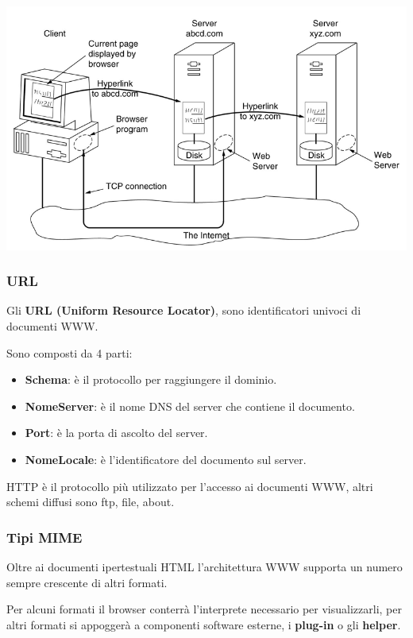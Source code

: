         \begin{center}
            \includegraphics[scale=0.4]{chapters/6/assets/schema_h.png}
        \end{center}

        \subsubsection{URL}
            Gli \textbf{URL (Uniform Resource Locator)}, sono identificatori univoci di documenti WWW.

            Sono composti da 4 parti:
            \begin{itemize}
                \item \textbf{Schema}: è il protocollo per raggiungere il dominio.
                \item \textbf{NomeServer}: è il nome DNS del server che contiene il documento.
                \item \textbf{Port}: è la porta di ascolto del server.
                \item \textbf{NomeLocale}: è l'identificatore del documento sul server.
            \end{itemize}

            HTTP è il protocollo più utilizzato per l'accesso ai documenti WWW, altri schemi diffusi sono ftp, file, about.

        \subsubsection{Tipi MIME}
            Oltre ai documenti ipertestuali HTML l'architettura WWW supporta un numero sempre crescente di altri formati.
        
            Per alcuni formati il browser conterrà l'interprete necessario per visualizzarli, per altri formati si appoggerà a componenti software esterne, i \textbf{plug-in} o gli \textbf{helper}.
        
